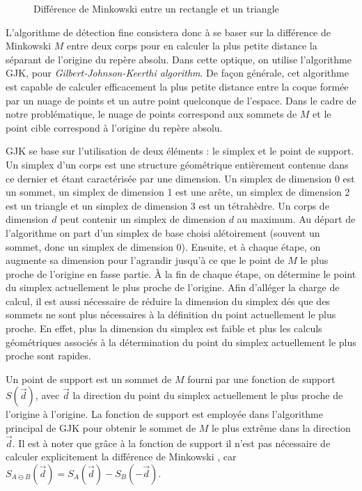 \begin{figure}
  \centering
  \subfloat[]{  }
  \subfloat[]{  }
  \caption{Différence de Minkowski entre un rectangle et un triangle}
  \label{minkowski}
\end{figure}

L'algorithme de détection fine consistera donc à se baser sur la
différence de Minkowski $M$ entre deux corps pour en calculer la plus
petite distance la séparant de l'origine du repère absolu. Dans cette
optique, on utilise l'algorithme GJK, pour
\textit{Gilbert-Johnson-Keerthi algorithm}. De façon générale, cet
algorithme est capable de calculer efficacement la plus petite
distance entre la coque formée par un nuage de points et un autre
point quelconque de l'espace. Dans le cadre de notre problématique, le
nuage de points correspond aux sommets de $M$ et le point cible
correspond à l'origine du repère absolu.

GJK se base sur l'utilisation de deux éléments : le simplex et le
point de support. Un simplex d'un corps est une structure géométrique
entièrement contenue dans ce dernier et étant caractérisée par une
dimension. Un simplex de dimension 0 est un sommet, un simplex de
dimension 1 est une arête, un simplex de dimension 2 est un triangle
et un simplex de dimension 3 est un tétrahèdre. Un corps de dimension
$d$ peut contenir un simplex de dimension $d$ au maximum. Au départ de
l'algorithme on part d'un simplex de base choisi alétoirement (souvent
un sommet, donc un simplex de dimension 0). Ensuite, et à chaque
étape, on augmente sa dimension pour l'agrandir jusqu'à ce que le
point de $M$ le plus proche de l'origine en fasse partie. \`A la fin
de chaque étape, on détermine le point du simplex actuellement le plus
proche de l'origine. Afin d'alléger la charge de calcul, il est aussi
nécessaire de réduire la dimension du simplex dés que des sommets ne
sont plus nécessaires à la définition du point actuellement le plus
proche. En effet, plus la dimension du simplex est faible et plus les
calculs géométriques associés à la détermination du point du simplex
actuellement le plus proche sont rapides.

Un point de support est un sommet de $M$ fourni par une fonction de
support $S(\vec{d})$, avec $\vec{d}$ la direction du point du simplex
actuellement le plus proche de l'origine à l'origine. La fonction de
support est employée dans l'algorithme principal de GJK pour obtenir
le sommet de $M$ le plus extrême dans la direction $\vec{d}$. Il est à
noter que grâce à la fonction de support il n'est pas nécessaire de
calculer explicitement la différence de Minkowski \cite{ericson}, car
$S_{A \ominus B}(\vec{d}) = S_A(\vec{d}) - S_B(-\vec{d})$.

